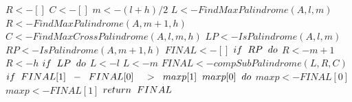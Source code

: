 \documentclass{article}
\begin{document}
\indent\indent\(R<-[]\)\newline
\indent\indent\(C<-[]\)\newline
\indent\indent\(m<-(l+h)/2\)\newline
\indent\indent\(L<-FindMaxPalindrome(A,l,m)\)\newline
\indent\indent\(R<-FindMaxPalindrome(A,m+1,h)\)\newline
\indent\indent\(C<-FindMaxCrossPalindrome(A,l,m,h)\)\newline
\indent\indent\(LP<-IsPalindrome(A, l, m)\)\newline
\indent\indent\(RP<-IsPalindrome(A, m+1, h)\)\newline
\indent\indent\(FINAL<-[]\)\newline
\indent\indent\(if\hspace{0,2cm}RP\hspace{0,2cm}do\)\newline
\indent\indent\indent\(R<-m+1\)\newline
\indent\indent\indent\(R<-h\)\newline
\indent\indent\(if\hspace{0,2cm}LP\hspace{0,2cm}do\)\newline
\indent\indent\indent\(L<-l\)\newline
\indent\indent\indent\(L<-m\)\newline
\indent\indent\(FINAL<-compSubPalindrome(L,R,C)\)\newline
\indent\indent\(if\hspace{0,2cm}FINAL[1]\hspace{0,2cm}-\hspace{0,2cm}FINAL[0]\hspace{0,2cm}\hspace{0,2cm}>\hspace{0,2cm}maxp[1]\hspace{0,2cm}maxp[0]\hspace{0,2cm}do\)\newline
\indent\indent\indent\(maxp<-FINAL[0]\)\newline
\indent\indent\indent\(maxp<-FINAL[1]\)\newline
\indent\indent\(return\hspace{0,2cm}FINAL\)\newline
\end{document}
